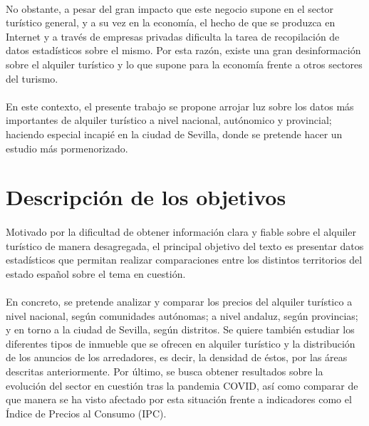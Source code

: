 \documentclass[a4paper]{article}
\begin{document}
        \paragraph*{}
        No obstante, a pesar del gran impacto que este negocio supone en el sector turístico general, y a su vez en la economía, el hecho de que se
        produzca en Internet y a través de empresas privadas dificulta la tarea de recopilación de datos estadísticos sobre el mismo. Por esta razón,
        existe una gran desinformación sobre el alquiler turístico y lo que supone para la economía frente a otros sectores del turismo.

        \paragraph*{}
        En este contexto, el presente trabajo se propone arrojar luz sobre los datos más importantes de alquiler turístico a nivel nacional, autónomico y 
        provincial; haciendo especial incapié en la ciudad de Sevilla, donde se pretende hacer un estudio más pormenorizado. 

    \newpage

    \section{Descripción de los objetivos}

        \paragraph*{}
        Motivado por la dificultad de obtener información clara y fiable sobre el alquiler turístico de manera desagregada,
        el principal objetivo del texto es presentar datos estadísticos que permitan realizar comparaciones entre los distintos
        territorios del estado español sobre el tema en cuestión.
        
        \paragraph*{}
        En concreto, se pretende analizar y comparar los precios del alquiler turístico a nivel nacional, según comunidades 
        autónomas; a nivel andaluz, según provincias; y en torno a la ciudad de Sevilla, según distritos. Se quiere también estudiar los diferentes tipos de 
        inmueble que se ofrecen en alquiler turístico y la distribución de los anuncios de los arredadores, es decir, la densidad de éstos, por las áreas 
        descritas anteriormente. Por último, se busca obtener resultados sobre la evolución del sector en cuestión tras la pandemia COVID, así como 
        comparar de que manera se ha visto afectado por esta situación frente a indicadores como el Índice de Precios al Consumo (IPC).
\end{document}

